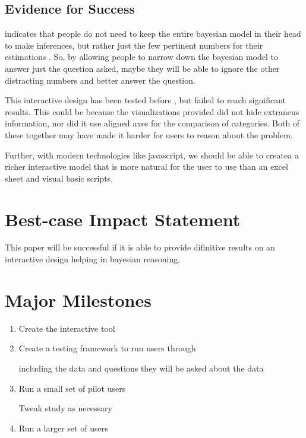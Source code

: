 \documentclass{proc}
\begin{document}
\subsection{Evidence for Success}

indicates that people do not need to keep the entire bayesian model in their head to make inferences, but 
rather just the few pertinent numbers for their estimations \cite{Gigerenzer1995}. So, by allowing people
to narrow down the bayesian model to answer just the question asked, maybe they will be able to ignore the other
distracting numbers and better answer the question. 

This interactive design has been tested before \cite{Tsai2011}, but failed to reach significant results.
This could be because the visualizations provided did not hide extraneus information, nor did it use aligned axes
for the comparison of categories. Both of these together may have made it harder for users to reason about the problem. 

Further, with modern technologies like javascript, we should be able to createa a richer interactive model 
that is more natural for the user to use than an excel sheet and visual basic scripts. 


\section{Best-case Impact Statement}
This paper will be successful if it is able to provide difinitive results on an interactive design helping in 
bayesian reasoning. 

\section{Major Milestones}

\begin{enumerate}
    \item Create the interactive tool
    \item Create a testing framework to run users through

    including the data and questions they will be asked about the data

    \item Run a small set of pilot users

    Tweak study as necessary

    \item Run a larger set of users
\end{enumerate}
\end{document}
